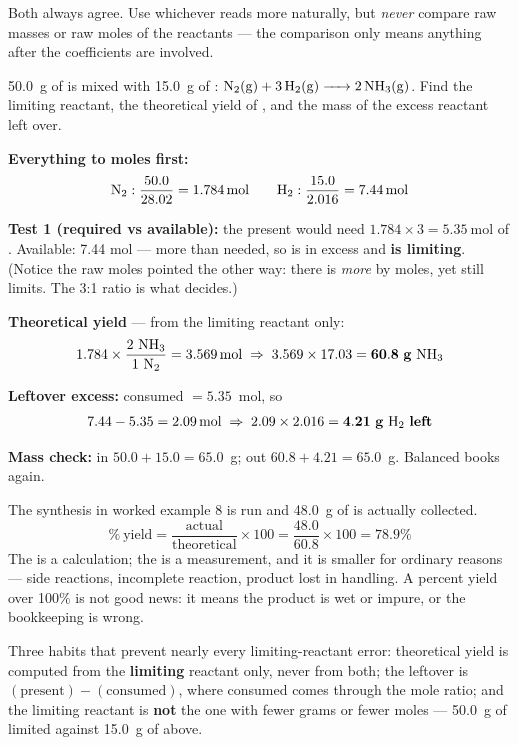 \documentclass{apchem-worksheet}
\begin{document}
Both always agree. Use whichever reads more naturally, but \emph{never}
compare raw masses or raw moles of the reactants --- the comparison only
means anything after the coefficients are involved.

\begin{workedexample}
\SI{50.0}{\gram} of  is mixed with \SI{15.0}{\gram} of :
$\ce{N2(g) + 3H2(g) -> 2NH3(g)}$. Find the limiting reactant, the
theoretical yield of , and the mass of the excess reactant left
over.

\textbf{Everything to moles first:}
\[ \ce{N2}: \frac{50.0}{28.02} = \SI{1.784}{\mole} \qquad
   \ce{H2}: \frac{15.0}{2.016} = \SI{7.44}{\mole} \]

\textbf{Test 1 (required vs available):} the  present would need
$1.784 \times 3 = \SI{5.35}{\mole}$ of . Available: 7.44 mol ---
more than needed, so  is in excess and \textbf{ is
limiting}. (Notice the raw moles pointed the other way: there is
\emph{more}  by moles, yet  still limits. The 3:1 ratio is
what decides.)

\textbf{Theoretical yield} --- from the limiting reactant only:
\[ 1.784 \times \frac{2~\ce{NH3}}{1~\ce{N2}} = \SI{3.569}{\mole}
   \;\Rightarrow\; 3.569 \times 17.03 = \mathbf{60.8~g~\ce{NH3}} \]

\textbf{Leftover excess:}  consumed $= 5.35$~mol, so
\[ 7.44 - 5.35 = \SI{2.09}{\mole} \;\Rightarrow\;
   2.09 \times 2.016 = \mathbf{4.21~g~\ce{H2}~left} \]

\textbf{Mass check:} in $50.0 + 15.0 = 65.0$~g; out
$60.8 + 4.21 = 65.0$~g. Balanced books again.
\end{workedexample}

\begin{workedexample}
The synthesis in worked example 8 is run and \SI{48.0}{\gram} of 
is actually collected.
\[ \%~\text{yield} = \frac{\text{actual}}{\text{theoretical}} \times 100
   = \frac{48.0}{60.8} \times 100 = \mathbf{78.9\%} \]
The  is a calculation; the  is
a measurement, and it is smaller for ordinary reasons --- side reactions,
incomplete reaction, product lost in handling. A percent yield over 100\%
is not good news: it means the product is wet or impure, or the
bookkeeping is wrong.
\end{workedexample}

\begin{apctrap}
Three habits that prevent nearly every limiting-reactant error:
theoretical yield is computed from the \textbf{limiting} reactant only,
never from both; the leftover is
$(\text{present}) - (\text{consumed})$, where consumed comes through the
mole ratio; and the limiting reactant is \textbf{not} the one with fewer
grams or fewer moles --- \SI{50.0}{\gram} of  limited against
\SI{15.0}{\gram} of  above.
\end{apctrap}
\end{document}
